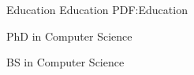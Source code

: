 \Section
{Education}
{Education}
{PDF:Education}

\Entry
\UMassTitle
\dotfill
\textbf{}
\SubEntry
\Gap
PhD in Computer Science

\BigGap
\Entry
\TrinityTitle
\dotfill
\textbf{}
\SubEntry
\Gap
BS in Computer Science
